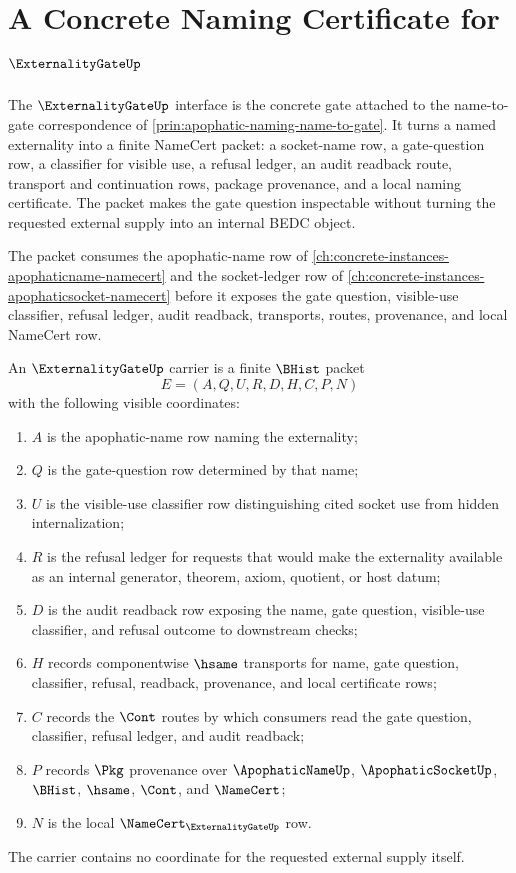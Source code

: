 \chapter{A Concrete Naming Certificate for $\ExternalityGateUp$}
\label{ch:concrete-instances-externalitygate-namecert}

The $\ExternalityGateUp$ interface is the concrete gate attached to the
name-to-gate correspondence of \autoref{prin:apophatic-naming-name-to-gate}. It
turns a named externality into a finite NameCert packet: a socket-name row, a
gate-question row, a classifier for visible use, a refusal ledger, an audit
readback route, transport and continuation rows, package provenance, and a
local naming certificate. The packet makes the gate question inspectable
without turning the requested external supply into an internal BEDC object.

The packet consumes the apophatic-name row of \autoref{ch:concrete-instances-apophaticname-namecert} and the socket-ledger row of \autoref{ch:concrete-instances-apophaticsocket-namecert} before it exposes the gate question, visible-use classifier, refusal ledger, audit readback, transports, routes, provenance, and local NameCert row.

\begin{definition}
\label{def:externality-gate-carrier}
An $\ExternalityGateUp$ carrier is a finite $\BHist$ packet
$$
E=(A,Q,U,R,D,H,C,P,N)
$$
with the following visible coordinates:
\begin{enumerate}
\item $A$ is the apophatic-name row naming the externality;
\item $Q$ is the gate-question row determined by that name;
\item $U$ is the visible-use classifier row distinguishing cited socket use
from hidden internalization;
\item $R$ is the refusal ledger for requests that would make the externality
available as an internal generator, theorem, axiom, quotient, or host datum;
\item $D$ is the audit readback row exposing the name, gate question, visible-use
classifier, and refusal outcome to downstream checks;
\item $H$ records componentwise $\hsame$ transports for name, gate question,
classifier, refusal, readback, provenance, and local certificate rows;
\item $C$ records the $\Cont$ routes by which consumers read the gate question,
classifier, refusal ledger, and audit readback;
\item $P$ records $\Pkg$ provenance over $\ApophaticNameUp$,
$\ApophaticSocketUp$, $\BHist$, $\hsame$, $\Cont$, and $\NameCert$;
\item $N$ is the local $\NameCert_{\ExternalityGateUp}$ row.
\end{enumerate}
The carrier contains no coordinate for the requested external supply itself.
\end{definition}

